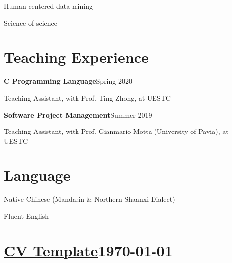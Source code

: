\documentclass{article}
\begin{document}
Human-centered data mining

Science of science









\section*{Teaching Experience}
\indent


\textbf{C Programming Language}\hfill Spring 2020

\hspace{2em}Teaching Assistant, with Prof. Ting Zhong, at UESTC

\textbf{Software Project Management}\hfill Summer 2019

\hspace{2em}Teaching Assistant, with Prof. Gianmario Motta (University of Pavia), at UESTC








\section*{Language}
\indent

Native Chinese (Mandarin \& Northern Shaanxi Dialect)

Fluent English





\vfill

\section*{\color{OliveGreen}\href{https://github.com/Xovee/latex-cv}{CV Template}\hfill\today}
\end{document}
